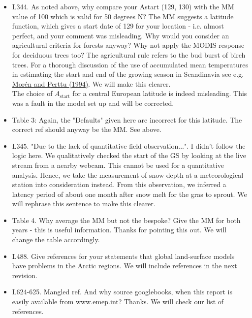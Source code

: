 \documentclass{scrartcl}
\begin{document}
\begin{itemize}
\item {\color{blue}L344. As noted above, why compare your Astart (129, 130) with the MM value of 100 which is valid for 50 degrees N? The MM suggests a latitude function, which gives a start date of 129 for your location - i.e. almost perfect, and your comment was misleading. Why would you consider an agricultural criteria for forests anyway? Why not apply the MODIS response for deciduous trees too?} The agricultural rule refers to the bud burst of birch trees. For a thorough discussion of the use of accumulated mean temperatures in estimating the start and end of the growing season in Scandinavia see e.g. \href{https://pub.epsilon.slu.se/3910/1/SFS194.pdf}{Morén and Perttu (1994)}. We will make this clearer. \\The choice of $A_\mathrm{start}$ for a central European latitude is indeed misleading. This was a fault in the model set up and will be corrected.

\item {\color{blue}Table 3: Again, the "Defaults" given here are incorrect for this latitude. The correct ref should anyway be the MM.}
See above.

\item {\color{blue}L345. "Due to the lack of quantitative field observation...". I didn't follow the logic here.} We qualitatively checked the start of the GS by looking at the live stream from a nearby webcam. This cannot be used for a quantitative analysis. Hence, we take the measurement of snow depth at a meteorological station into consideration instead. From this observation, we inferred a latency period of about one month after snow melt for the gras to sprout. We will rephrase this sentence to make this clearer.

\item {\color{blue}Table 4. Why average the MM but not the bespoke? Give the MM for both years - this is useful information.}
Thanks for pointing this out. We will change the table accordingly.

\item {\color{blue}L488. Give references for your statements that global land-surface models have problems in the Arctic regions.}
We will include references in the next revision.

\item {\color{blue}L624-625. Mangled ref. And why source googlebooks, when this report is easily available from www.emep.int?}
Thanks. We will check our list of references.


\end{itemize}
\end{document}
